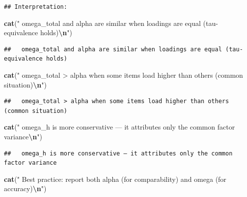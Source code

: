 \documentclass[
]{article}
\newenvironment{Shaded}{\begin{snugshade}}{\end{snugshade}}
\newcommand{\FunctionTok}[1]{\textcolor[rgb]{0.13,0.29,0.53}{\textbf{#1}}}
\newcommand{\NormalTok}[1]{#1}
\newcommand{\SpecialCharTok}[1]{\textcolor[rgb]{0.81,0.36,0.00}{\textbf{#1}}}
\newcommand{\StringTok}[1]{\textcolor[rgb]{0.31,0.60,0.02}{#1}}
\begin{document}
\begin{verbatim}
## Interpretation:
\end{verbatim}

\begin{Shaded}
\begin{Highlighting}[]
\FunctionTok{cat}\NormalTok{(}\StringTok{"  omega\_total and alpha are similar when loadings are equal (tau{-}equivalence holds)}\SpecialCharTok{\textbackslash{}n}\StringTok{"}\NormalTok{)}
\end{Highlighting}
\end{Shaded}

\begin{verbatim}
##   omega_total and alpha are similar when loadings are equal (tau-equivalence holds)
\end{verbatim}

\begin{Shaded}
\begin{Highlighting}[]
\FunctionTok{cat}\NormalTok{(}\StringTok{"  omega\_total \textgreater{} alpha when some items load higher than others (common situation)}\SpecialCharTok{\textbackslash{}n}\StringTok{"}\NormalTok{)}
\end{Highlighting}
\end{Shaded}

\begin{verbatim}
##   omega_total > alpha when some items load higher than others (common situation)
\end{verbatim}

\begin{Shaded}
\begin{Highlighting}[]
\FunctionTok{cat}\NormalTok{(}\StringTok{"  omega\_h is more conservative — it attributes only the common factor variance}\SpecialCharTok{\textbackslash{}n}\StringTok{"}\NormalTok{)}
\end{Highlighting}
\end{Shaded}

\begin{verbatim}
##   omega_h is more conservative — it attributes only the common factor variance
\end{verbatim}

\begin{Shaded}
\begin{Highlighting}[]
\FunctionTok{cat}\NormalTok{(}\StringTok{"  Best practice: report both alpha (for comparability) and omega (for accuracy)}\SpecialCharTok{\textbackslash{}n}\StringTok{"}\NormalTok{)}
\end{Highlighting}
\end{Shaded}
\end{document}
